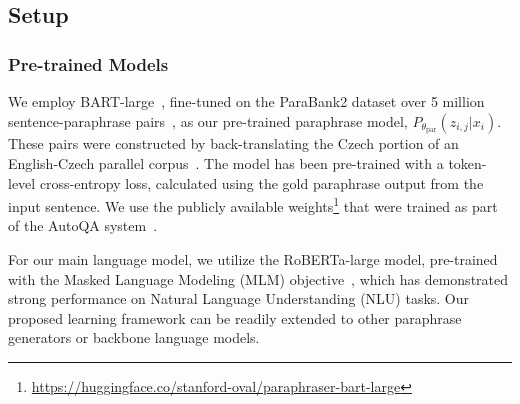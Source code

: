 \documentclass[11pt]{article}
\begin{document}
\subsection{Setup}
\subsubsection{Pre-trained Models}
We employ BART-large~\cite{lewis-etal-2020-bart}, fine-tuned on the ParaBank2 dataset over 5 million sentence-paraphrase pairs~\cite{hu-etal-2019-large}, as our pre-trained paraphrase model, $P_{\theta_{\text{par}}} (z_{i,j} | x_{i})$. These pairs were constructed by back-translating the Czech portion of an English-Czech parallel corpus~\cite{hu-etal-2019-large}. The model has been pre-trained with a token-level cross-entropy loss, calculated using the gold paraphrase output from the input sentence. We use the publicly available weights\footnote{\url{https://huggingface.co/stanford-oval/paraphraser-bart-large}} that were trained as part of the AutoQA system~\cite{xu-etal-2020-autoqa}.

\begin{comment}
Given that some of our classification experiments were conducted on the GLUE benchmark~\cite{DBLP:journals/corr/abs-1804-07461}, we opted for the BART-based model over the T5 pre-trained model. This decision was made because the GLUE dataset was part of the supervised corpora used for pre-training T5 models~\cite{DBLP:journals/corr/abs-1910-10683}. Moreover, the BART-large model, fine-tuned on the paraphrase corpus, has not encountered the input sentences and corresponding class labels of the GLUE datasets in its initial pre-training dataset.
\end{comment}

For our main language model, we utilize the RoBERTa-large model, pre-trained with the Masked Language Modeling (MLM) objective~\cite{DBLP:journals/corr/abs-1907-11692}, which has demonstrated strong performance on Natural Language Understanding (NLU) tasks. Our proposed learning framework can be readily extended to other paraphrase generators or backbone language models.
\end{document}
